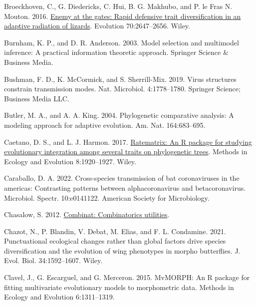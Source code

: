 \documentclass[fleqn,10pt,lineno]{wlpeerj} %
\newlength{\cslhangindent}
\newlength{\cslentryspacingunit} %
\newenvironment{CSLReferences}[2] %
 {%
  \setlength{\parindent}{0pt}
  \ifodd #1
  \let\oldpar\par
  \def\par{\hangindent=\cslhangindent\oldpar}
  \fi
  \setlength{\parskip}{#2\cslentryspacingunit}
 }%
 {}
\begin{document}
\begin{CSLReferences}{1}{0}
\leavevmode{}%
Broeckhoven, C., G. Diedericks, C. Hui, B. G. Makhubo, and P. le Fras N. Mouton. 2016. \href{https://doi.org/10.1111/evo.13062}{Enemy at the gates: Rapid defensive trait diversification in an adaptive radiation of lizards}. Evolution 70:2647--2656. Wiley.

\leavevmode{}%
Burnham, K. P., and D. R. Anderson. 2003. Model selection and multimodel inference: A practical information theoretic approach. Springer Science \& Business Media.

\leavevmode{}%
Bushman, F. D., K. McCormick, and S. Sherrill-Mix. 2019. Virus structures constrain transmission modes. Nat. Microbiol. 4:1778--1780. Springer Science; Business Media LLC.

\leavevmode{}%
Butler, M. A., and A. A. King. 2004. Phylogenetic comparative analysis: A modeling approach for adaptive evolution. Am. Nat. 164:683--695.

\leavevmode{}%
Caetano, D. S., and L. J. Harmon. 2017. \href{https://doi.org/10.1111/2041-210x.12826}{Ratematrix: An {R} package for studying evolutionary integration among several traits on phylogenetic trees}. Methods in Ecology and Evolution 8:1920--1927. Wiley.

\leavevmode{}%
Caraballo, D. A. 2022. Cross-species transmission of bat coronaviruses in the americas: Contrasting patterns between alphacoronavirus and betacoronavirus. Microbiol. Spectr. 10:e0141122. American Society for Microbiology.

\leavevmode{}%
Chasalow, S. 2012. \href{https://CRAN.R-project.org/package=combinat}{Combinat: Combinatorics utilities}.

\leavevmode{}%
Chazot, N., P. Blandin, V. Debat, M. Elias, and F. L. Condamine. 2021. Punctuational ecological changes rather than global factors drive species diversification and the evolution of wing phenotypes in morpho butterflies. J. Evol. Biol. 34:1592--1607. Wiley.

\leavevmode{}%
Clavel, J., G. Escarguel, and G. Merceron. 2015. Mv{MORPH}: An {R} package for fitting multivariate evolutionary models to morphometric data. Methods in Ecology and Evolution 6:1311--1319.


\end{CSLReferences}
\end{document}
